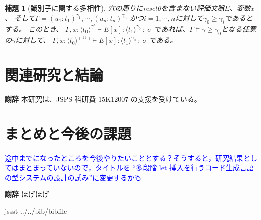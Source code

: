 \documentclass[T]{compsoft}
\newcommand\blue[1]{\textcolor{blue}{#1}}
\newcommand\Resetz{\textbf{reset0}}
\newcommand\codeT[2]{\langle{#1}\rangle^{#2}}
\newcommand\ord{\ge}
\newcommand\lto{\leadsto}
\newcommand\ooi[1]{\blue{{#1}}}
\theoremstyle{break}
\newtheorem{theo}{定理}[section]
\newtheorem{lemm}{補題}[section]
\begin{document}
\begin{lemm}[識別子に関する多相性]
  穴の周りにreset0を含まない評価文脈$E$、変数$x$、
  そして$\Gamma = (u_1:t_1)^{\gamma_1}, \cdots, (u_n:t_n)^{\gamma_n}$
      かつ$i=1,\cdots,n$に対して$\gamma_0 \ord \gamma_i$であるとする。
  このとき、
  $\Gamma, x:\codeT{t_0}{\gamma'} \vdash E[x] : \codeT{t_1}{\gamma_0} ~;~\sigma$
  であれば、$\Gamma \models \gamma \ord \gamma_0$となる任意の$\gamma$に対して、
  $\Gamma, x:\codeT{t_0}{\gamma'\cup \gamma} \vdash
   E[x] : \codeT{t_1}{\gamma_0} ~;~\sigma$
  である。
\end{lemm}

%

\section{関連研究と結論}

{\bf 謝辞} 本研究は、JSPS 科研費 15K12007 の支援を受けている。

\section{まとめと今後の課題}
\ooi{途中までになったところを今後やりたいこととする？そうすると，研究結果としてはまとまっていないので，タイトルを ``多段階 let 挿入を行うコード生成言語の型システムの設計の試み''に変更するかも}

{\bf 謝辞}
ほげほげ

 {jssst}
 {../../bib/bibfile}
\end{document}
